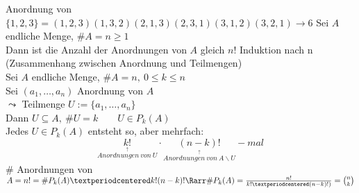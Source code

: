 \bsp
Anordnung von $\{1,2,3\}=(1,2,3)(1,3,2)(2,1,3)(2,3,1)(3,1,2)(3,2,1)→6$
%
Sei $A$ endliche Menge, $\#A=n\geq 1$\\
Dann ist die Anzahl der Anordnungen von $A$ gleich $n!$
\bew
Induktion nach n
%
\bem
(Zusammenhang zwischen Anordnung und Teilmengen)\\
Sei $A$ endliche Menge, $\#A=n,\ 0\leq k\leq n$\\
Sei $(a_1,…,a_n)$ Anordnung von $A$\\
$\leadsto$ Teilmenge $U:=\{a_1,…,a_n\}$\\
Dann $U\subseteq A,\ \#U=k\qquad U\in P_k(A)$\\
Jedes $U\in P_k(A)$ entsteht so, aber mehrfach:\\
\[\underset{\overset{\uparrow}{Anordnungen\ von\ U}}{k!}·\underset{\overset{\uparrow}{Anordnungen\ von\ A\backslash U}}{(n-k)!}-mal\]
$\#$ Anordnungen von $A=n!=\#P_k(A)·k!(n-k)!\Rarr\#P_k(A)=\frac{n!}{k!·(n-k)!)}=\binom{n}{k}$\\
%
